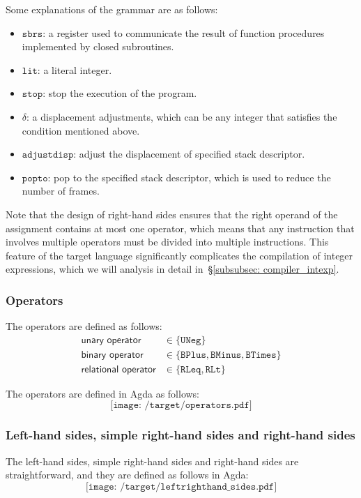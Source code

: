 \documentclass[12pt,a4paper]{report}
\theoremstyle{definition}
\newcommand{\secref}[1]{\S\ref{#1}}
\begin{document}
    Some explanations of the grammar are as follows:
    \begin{itemize}
        \item 
            $\texttt{sbrs}$: a register used to communicate the result of function procedures implemented by closed subroutines.
        \item 
            $\texttt{lit}$: a literal integer.
        \item 
            $\texttt{stop}$: stop the execution of the program.
        \item 
            $\delta$: a displacement adjustments, which can be any integer that satisfies the condition mentioned above.
        \item 
            $\texttt{adjustdisp}$: adjust the displacement of specified stack descriptor.
        \item 
            $\texttt{popto}$: pop to the specified stack descriptor, which is used to reduce the number of frames.
    \end{itemize}
    Note that the design of right-hand sides ensures that the right operand of the assignment contains at most one operator, which means that any instruction that involves multiple operators must be divided into multiple instructions. This feature of the target language significantly complicates the compilation of integer expressions, which we will analysis in detail in~\secref{subsubsec: compiler_intexp}.


    \subsubsection{Operators}
    The operators are defined as follows:
    \[\begin{aligned}
        \textsf{unary operator} &\in \{\texttt{UNeg}\} \\
        \textsf{binary operator} &\in \{\texttt{BPlus}, \texttt{BMinus}, \texttt{BTimes}\} \\
        \textsf{relational operator} &\in \{\texttt{RLeq}, \texttt{RLt}\}
    \end{aligned}\]

    The operators are defined in Agda as follows:
    \[\texttt{[image: /target/operators.pdf]}\]

    \subsubsection{Left-hand sides, simple right-hand sides and right-hand sides}
    The left-hand sides, simple right-hand sides and right-hand sides are straightforward, and they are defined as follows in Agda:
    \[\texttt{[image: /target/leftrighthand\_sides.pdf]}\]
\end{document}
